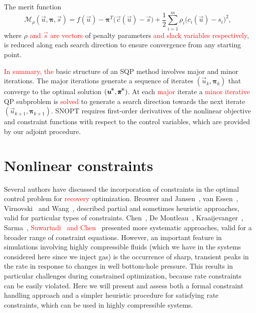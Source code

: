 \documentclass[twocolumn,numbook]{svjour3}          %
\newcommand{\red}[1]{\textcolor{red}{#1}}
\def\u{{\vec u}}
\def\c{{\vec c}}
\def\s{{\vec s}}
\def\bpi{{\pmb{\pi}}}%
\def\half  {{\textstyle{\frac12}}}
\def\kp#1{_{k+#1}}
\def\Mscr{{\mathcal M}}
\def\nthinsp{\mskip -2   mu}
\def\bpistar{\bpi\superstar}
\def\superstar{^{\raise 0.5pt\hbox{$\nthinsp *$}}}
\def\T{^T\!}
\def\ustar{\u\superstar}
\def\SNOPT {{\small SNOPT}}
\begin{document}
The merit function 
\begin{equation}                              \label{eqn-def-merit}
        \Mscr_\rho(\u,\bpi,\s)
          = f(\u) - \bpi\T \bigl( \c(\u) - \s \bigr)
            + \half \sum_{i=1}^m \rho_i\big( c_i(\u) - s_i\big)^2,
\end{equation}
where $\rho$ \red{and $\s$ are vectors} of penalty parameters \red{and slack variables respectively}, 
is reduced along each search
direction to ensure convergence from any starting point.

\red{In summary, the} basic structure of an SQP method involves major and
minor iterations.  The major iterations generate a sequence of
iterates $(\u_k,\bpi_k)$ that converge to the optimal solution $(\ustar,\bpistar)$.
At each \red{major} iterate a \red{minor iterative} QP subproblem is \red{solved} to generate a search direction
towards the next iterate $(\u\kp1,\bpi\kp1)$.
\SNOPT{} requires first-order derivatives of the nonlinear
objective and constraint functions with respect to the control variables, which
are provided by our adjoint procedure.



\section{Nonlinear constraints} \label{sec:constraints} 
Several authors have discussed the incorporation of constraints in the optimal
control problem for \red{recovery} optimization. Brouwer and 
Jansen~\cite{Brouwer:2004}, van Essen~\cite{VanEssen}, Virnovski~\cite{Virnovski} and
Wang~\cite{Wang:2009},
described partial and sometimes heuristic approaches, valid for
particular types of constraints. Chen~\cite{Chen:2010}, De Montleau~\cite{Montleau},
 Kraaijevanger~\cite{Kraaijevanger}, Sarma~\cite{Pallav:2006, Pallav:2008}, \red{Suwartadi~\cite{Suwartadi:2012} and Chen~\cite{Chen:2010}}  
presented more systematic approaches, valid for a broader range of constraint equations. However, an important feature in simulations involving highly compressible fluids (which we have in the systems considered here since we inject gas) is the occurrence of sharp, transient peaks in the rate in response to changes in well bottom-hole pressure. This results in
particular challenges during constrained optimization, because rate constraints can be easily violated. Here we will present and assess both a formal constraint handling approach and a simpler heuristic procedure for satisfying rate constraints, which can be used in highly compressible systems.
\end{document}

